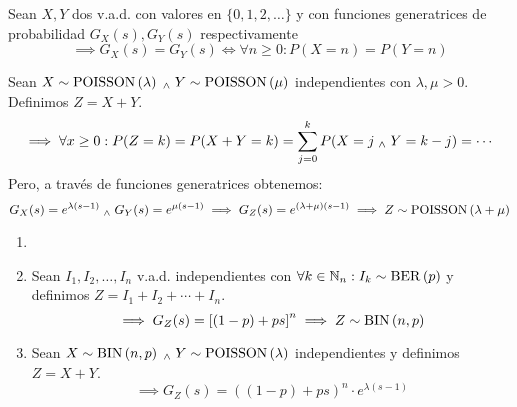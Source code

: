 \begin{teo}[Unicidad]
	Sean $X, Y$ dos v.a.d. con valores en $\{0, 1, 2, \dots\}$ y con funciones generatrices de probabilidad $G_X(s), G_Y(s)$ respectivamente
	\[\implies G_X(s)=G_Y(s) \iff \forall n\geq 0 : P(X=n)=P(Y=n)\]
\end{teo}

\begin{ejem}
	Sean $X\sim\operatorname{POISSON}\left(\lambda\right) \; _{\wedge} \; Y\sim\operatorname{POISSON}\left(\mu\right)$ independientes con $\lambda, \mu > 0$. Definimos $Z=X+Y$.
	\[\implies \forall x \geq 0 : P(Z=k) = P(X+Y=k)= \sum_{j=0}^{k} P(X=j \; _{\wedge} \; Y=k-j) = \cdots\]
	Pero, a través de funciones generatrices obtenemos:
	\[G_X(s)=e^{\lambda(s-1)} \; _{\wedge} \; G_Y(s)=e^{\mu(s-1)} \implies G_{Z}(s)=e^{(\lambda+\mu)(s-1)}\implies Z\sim\operatorname{POISSON}\left(\lambda+\mu\right)\]
\end{ejem}

\begin{ejem}
	\begin{enumerate}
		\item []
		\item Sean $I_1, I_2, \dots, I_n$ v.a.d. independientes con $\forall k \in \mathbb{N}_n : I_k\sim\operatorname{BER}\left(p\right)$ y definimos $Z=I_1+I_2+\cdots+I_n$.
		      \[\implies G_Z(s)={\left[(1-p)+ps\right]}^n \implies Z \sim \operatorname{BIN}\left(n, p\right)\]
		\item Sean $X \sim \operatorname{BIN}\left(n, p\right) \; _{\wedge} \; Y\sim \operatorname{POISSON}\left(\lambda\right)$ independientes y definimos $Z=X+Y$.
		      \[\implies G_Z(s)={\left((1-p)+ps\right)}^n\cdot e^{\lambda(s-1)}\]
	\end{enumerate}
\end{ejem}


